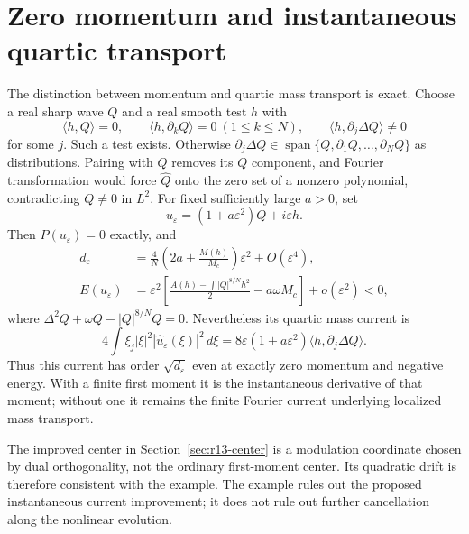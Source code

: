 \section{Zero momentum and instantaneous quartic transport}
The distinction between momentum and quartic mass transport is exact.
Choose a real sharp wave $Q$ and a real smooth test $h$ with
\[
 \langle h,Q\rangle=0,\qquad
 \langle h,\partial_kQ\rangle=0\ (1\le k\le N),\qquad
 \langle h,\partial_j\Delta Q\rangle\ne0
\]
for some $j$. Such a test exists. Otherwise
$\partial_j\Delta Q\in\operatorname{span}\{Q,\partial_1Q,\ldots,
\partial_NQ\}$ as distributions. Pairing with $Q$ removes its $Q$
component, and Fourier transformation would force $\widehat Q$ onto
the zero set of a nonzero polynomial, contradicting $Q\ne0$ in $L^2$.
For fixed sufficiently large $a>0$, set
\[
 u_\varepsilon=(1+a\varepsilon^2)Q+i\varepsilon h.
\]
Then $P(u_\varepsilon)=0$ exactly, and
\begin{align*}
 d_\varepsilon
 &=\frac4N\left(2a+\frac{M(h)}{M_c}\right)\varepsilon^2
       +O(\varepsilon^4),\\
 E(u_\varepsilon)
 &=\varepsilon^2\left[
 \frac{A(h)-\int|Q|^{8/N}h^2}{2}-a\omega M_c\right]
       +o(\varepsilon^2)<0,
\end{align*}
where $\Delta^2Q+\omega Q-|Q|^{8/N}Q=0$.
Nevertheless its quartic mass current is
\[
 4\int\xi_j|\xi|^2|\widehat u_\varepsilon(\xi)|^2\,d\xi
 =8\varepsilon(1+a\varepsilon^2)
             \langle h,\partial_j\Delta Q\rangle.
\]
Thus this current has order $\sqrt{d_\varepsilon}$ even at exactly zero
momentum and negative energy. With a finite first moment it is the
instantaneous derivative of that moment; without one it remains the
finite Fourier current underlying localized mass transport.

The improved center in Section~\ref{sec:r13-center} is a modulation
coordinate chosen by dual orthogonality, not the ordinary first-moment
center. Its quadratic drift is therefore consistent with the example.
The example rules out the proposed instantaneous current improvement;
it does not rule out further cancellation along the nonlinear evolution.
